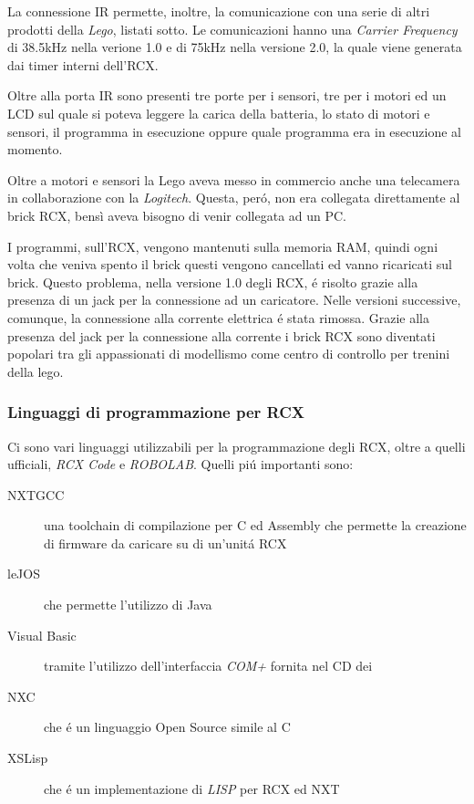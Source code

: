 La connessione IR permette, inoltre, la comunicazione con una serie di
altri prodotti della \emph{Lego}, listati sotto. Le comunicazioni hanno una
\emph{Carrier Frequency} di 38.5kHz nella verione 1.0 e di 75kHz nella
versione 2.0, la quale viene generata dai timer interni dell'RCX.

Oltre alla porta IR sono presenti tre porte per i sensori, tre per i
motori ed un LCD sul quale si poteva leggere la carica della batteria, lo
stato di motori e sensori, il programma in esecuzione oppure quale
programma era in esecuzione al momento.

Oltre a motori e sensori la Lego aveva messo in commercio anche una
telecamera in collaborazione con la \emph{Logitech}. Questa, per\'o, non
era collegata direttamente al brick RCX, bensì aveva bisogno di venir
collegata ad un PC.

I programmi, sull'RCX, vengono mantenuti sulla memoria RAM, quindi ogni
volta che veniva spento il brick questi vengono cancellati ed vanno
ricaricati sul brick. Questo problema, nella versione 1.0 degli RCX, \'e
risolto grazie alla presenza di un jack per la connessione ad un
caricatore. Nelle versioni successive, comunque, la connessione alla
corrente elettrica \'e stata rimossa. Grazie alla presenza del jack per la
connessione alla corrente i brick RCX sono diventati popolari tra gli
appassionati di modellismo come centro di controllo per trenini della lego.

\subsubsection{Linguaggi di programmazione per RCX}
Ci sono vari linguaggi utilizzabili per la programmazione degli RCX, oltre
a quelli ufficiali, \emph{RCX Code} e \emph{ROBOLAB}. Quelli pi\'u
importanti sono:
\begin{description}
    \item[NXTGCC]una toolchain di compilazione per C ed Assembly che
        permette la creazione di firmware da caricare su di un'unit\'a RCX
    \item[leJOS]che permette l'utilizzo di Java
    \item[Visual Basic]tramite l'utilizzo dell'interfaccia \emph{COM+}
        fornita nel CD dei \RIS{}
    \item[NXC]che \'e un linguaggio Open Source simile al C
    \item[XSLisp]che \'e un implementazione di \emph{LISP} per RCX ed NXT
\end{description}

